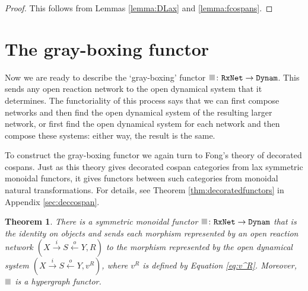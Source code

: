 \documentclass{compositionalityarticle}
\newcommand{\RxNet}{\mathtt{RxNet}}
\newcommand{\Dynam}{\mathtt{Dynam}}
\newcommand*{\graysquare}{\textcolor{lightgray}{\blacksquare}}
\newcommand{\maps}{\colon}
\theoremstyle{plain}
\newtheorem{thm}{Theorem}
\theoremstyle{remark}
\begin{document}
\begin{proof}
This follows from Lemmas \ref{lemma:DLax} and \ref{lemma:fcospans}.
\end{proof}

\section{The gray-boxing functor}
\label{sec:gray}

Now we are ready to describe the `gray-boxing' functor $\graysquare \maps \RxNet \to \Dynam$.  This sends any open reaction network to the open dynamical system that it determines.  The functoriality of this process says that we can first compose networks and then find the open dynamical system of the resulting larger network, or first find the open dynamical system for each network and then compose these systems: either way, the result is the same.

To construct the gray-boxing functor we again turn to Fong's theory of decorated
cospans.  Just as this theory gives decorated cospan categories from lax symmetric 
monoidal functors, it gives functors between such categories from monoidal natural transformations.  For details, see Theorem \ref{thm:decoratedfunctors} in Appendix \ref{sec:deccospan}.

\begin{thm}
There is a symmetric monoidal functor $\graysquare \maps \RxNet \to \Dynam$ that is
the identity on objects and sends each morphism represented by an open reaction network $( X \stackrel{i}{\to} S \stackrel{o}{\leftarrow} Y , R )$ to the morphism represented by the open dynamical system $( X \stackrel{i}{\to} S \stackrel{o}{\leftarrow} Y , v^R )$, where $v^R$ is defined by Equation \ref{eq:v^R}.  Moreover, $\graysquare$ is a hypergraph functor.
\end{thm}
\end{document}
